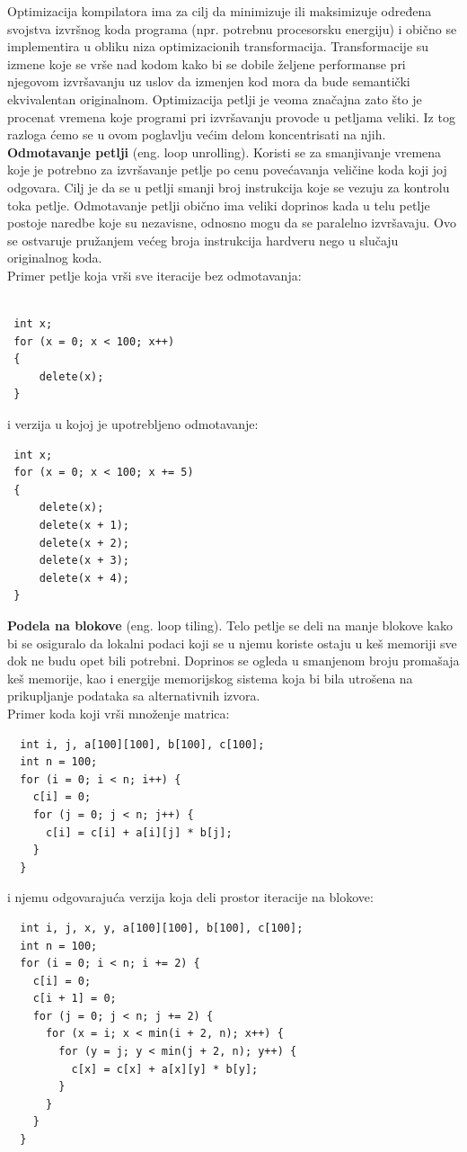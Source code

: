 \documentclass[a4paper]{article}
\begin{document}
Optimizacija kompilatora ima za cilj da minimizuje ili maksimizuje određena svojstva izvršnog koda programa (npr. potrebnu procesorsku energiju) i obično se implementira u obliku niza optimizacionih transformacija. Transformacije su izmene koje se vrše nad kodom kako bi se dobile željene performanse pri njegovom izvršavanju uz uslov da izmenjen kod mora da bude semantički ekvivalentan originalnom. Optimizacija petlji je veoma značajna zato što je procenat vremena koje programi pri izvršavanju provode u petljama veliki. Iz tog razloga ćemo se u ovom poglavlju većim delom koncentrisati na njih.  \\

\textbf{Odmotavanje petlji} (eng. loop unrolling). Koristi se za smanjivanje vremena koje je potrebno za
izvršavanje petlje po cenu povećavanja veličine koda koji joj odgovara. Cilj je da se u petlji
smanji broj instrukcija koje se vezuju za kontrolu toka petlje. Odmotavanje petlji obično ima
veliki doprinos kada u telu petlje postoje naredbe koje su nezavisne, odnosno mogu da se
paralelno izvršavaju. Ovo se ostvaruje pružanjem većeg broja instrukcija hardveru nego u 
slučaju originalnog koda.\\
Primer petlje koja vrši sve iteracije bez odmotavanja:
\begin{lstlisting}

 int x;
 for (x = 0; x < 100; x++)
 {
     delete(x);
 }
\end{lstlisting}
i verzija u kojoj je upotrebljeno odmotavanje:
\begin{lstlisting}
 int x; 
 for (x = 0; x < 100; x += 5)
 {
     delete(x);
     delete(x + 1);
     delete(x + 2);
     delete(x + 3);
     delete(x + 4);
 }
\end{lstlisting}


\textbf{Podela na blokove} (eng. loop tiling). Telo petlje se deli na manje blokove kako bi se osiguralo
da lokalni podaci koji se u njemu koriste ostaju u keš memoriji sve dok ne budu opet bili potrebni.
Doprinos se ogleda u smanjenom broju promašaja keš memorije, kao i energije memorijskog sistema koja
bi bila utrošena na prikupljanje podataka sa alternativnih izvora.\\
Primer koda koji vrši množenje matrica:

\begin{lstlisting}
  int i, j, a[100][100], b[100], c[100];
  int n = 100;
  for (i = 0; i < n; i++) {
    c[i] = 0;
    for (j = 0; j < n; j++) {
      c[i] = c[i] + a[i][j] * b[j];
    }
  }
\end{lstlisting}
i njemu odgovarajuća verzija koja deli prostor iteracije na blokove:
\begin{lstlisting}
  int i, j, x, y, a[100][100], b[100], c[100];
  int n = 100;
  for (i = 0; i < n; i += 2) {
    c[i] = 0;
    c[i + 1] = 0;
    for (j = 0; j < n; j += 2) {
      for (x = i; x < min(i + 2, n); x++) {
        for (y = j; y < min(j + 2, n); y++) {
          c[x] = c[x] + a[x][y] * b[y];
        }
      }
    }
  }
\end{lstlisting}
\end{document}
